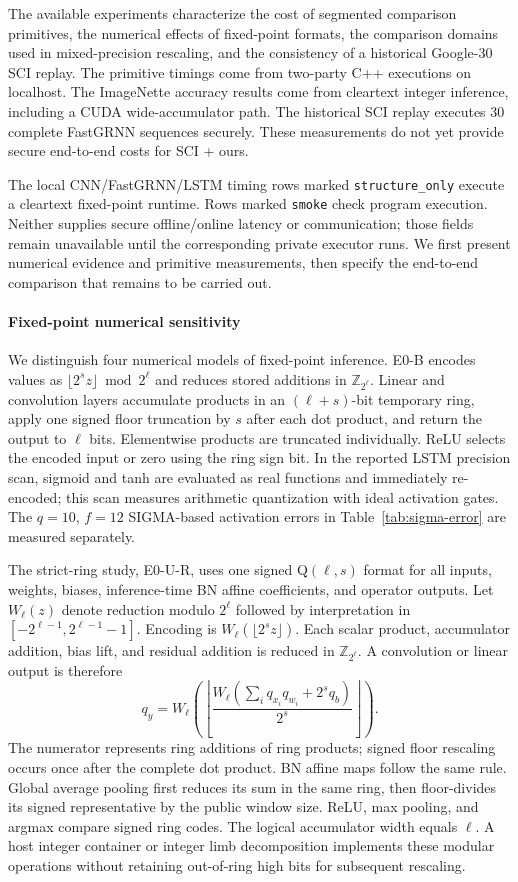 \documentclass[journal]{IEEEtran}
\theoremstyle{definition}
\theoremstyle{plain}
\begin{document}
The available experiments characterize the cost of segmented comparison
primitives, the numerical effects of fixed-point formats, the comparison domains
used in mixed-precision rescaling, and the consistency of a historical Google-30
SCI replay. The primitive timings come from two-party C++ executions on localhost.
The ImageNette accuracy results
come from cleartext integer inference, including a CUDA wide-accumulator path.
The historical SCI replay executes 30 complete FastGRNN sequences securely.
These measurements do not yet provide secure end-to-end costs for SCI + ours.

The local CNN/FastGRNN/LSTM timing rows marked \texttt{structure\_only} execute
a cleartext fixed-point runtime. Rows marked \texttt{smoke} check program
execution. Neither supplies secure offline/online latency or communication;
those fields remain unavailable until the corresponding private executor runs.
We first present numerical evidence and primitive measurements, then specify
the end-to-end comparison that remains to be carried out.

\paragraph*{Fixed-point numerical sensitivity}
We distinguish four numerical models of fixed-point inference. E0-B encodes
values as $\lfloor 2^s z\rfloor\bmod 2^\ell$ and reduces stored additions
in $\mathbb Z_{2^\ell}$. Linear and convolution layers accumulate products
in an $(\ell+s)$-bit temporary ring, apply one signed floor truncation by
$s$ after each dot product, and return the output to $\ell$ bits.
Elementwise products are truncated individually. ReLU selects the encoded
input or zero using the ring sign bit. In the reported LSTM precision scan,
sigmoid and tanh are evaluated as real functions and immediately re-encoded;
this scan measures arithmetic quantization with ideal activation gates.
The $q=10$, $f=12$ SIGMA-based activation errors in
Table~\ref{tab:sigma-error} are measured separately.

The strict-ring study, E0-U-R, uses one signed Q$(\ell,s)$ format for
all inputs, weights, biases, inference-time BN affine coefficients, and
operator outputs. Let $W_\ell(z)$ denote reduction modulo $2^\ell$
followed by interpretation in $[-2^{\ell-1},2^{\ell-1}-1]$.
Encoding is $W_\ell(\lfloor 2^s z\rfloor)$. Each scalar product,
accumulator addition, bias lift, and residual addition is reduced in
$\mathbb Z_{2^\ell}$. A convolution or linear output is therefore
\[
q_y=W_\ell\!\left(\left\lfloor\frac{
W_\ell(\sum_i q_{x_i}q_{w_i}+2^s q_b)}{2^s}\right\rfloor\right).
\]
The numerator represents ring additions of ring products; signed floor
rescaling occurs once after the complete dot product. BN affine maps
follow the same rule. Global average pooling first reduces its sum in
the same ring, then floor-divides its signed representative by the public
window size. ReLU, max pooling, and argmax compare signed ring codes.
The logical accumulator width equals $\ell$. A host integer container or
integer limb decomposition implements these modular operations without
retaining out-of-ring high bits for subsequent rescaling.
\end{document}

